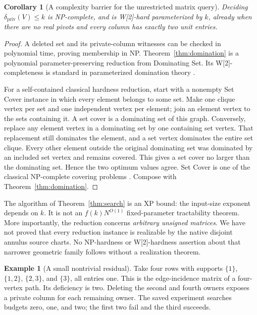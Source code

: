 \documentclass[11pt,letterpaper]{article}
\newtheorem{corollary}[theorem]{Corollary}
\theoremstyle{definition}
\newtheorem{example}[theorem]{Example}
\newcommand{\dpriv}{\delta_{\mathrm{priv}}}
\begin{document}
\begin{corollary}[A complexity barrier for the unrestricted matrix query]\label{cor:hardness}
Deciding $\dpriv(V)\le k$ is NP-complete, and is W[2]-hard parameterized by $k$, already when there are no real pivots and every column has exactly two unit entries.
\end{corollary}
\begin{proof}
A deleted set and its private-column witnesses can be checked in polynomial time, proving membership in NP. Theorem~\ref{thm:domination} is a polynomial parameter-preserving reduction from Dominating Set. Its W[2]-completeness is standard in parameterized domination theory \cite{CP}.

For a self-contained classical hardness reduction, start with a nonempty Set Cover instance in which every element belongs to some set. Make one clique vertex per set and one independent vertex per element; join an element vertex to the sets containing it. A set cover is a dominating set of this graph. Conversely, replace any element vertex in a dominating set by one containing set vertex. That replacement still dominates the element, and a set vertex dominates the entire set clique. Every other element outside the original dominating set was dominated by an included set vertex and remains covered. This gives a set cover no larger than the dominating set. Hence the two optimum values agree. Set Cover is one of the classical NP-complete covering problems \cite{Karp}. Compose with Theorem~\ref{thm:domination}.
\end{proof}

The algorithm of Theorem~\ref{thm:search} is an XP bound: the input-size exponent depends on $k$. It is not an $f(k)N^{O(1)}$ fixed-parameter tractability theorem. More importantly, the reduction concerns \emph{arbitrary unsigned matrices}. We have not proved that every reduction instance is realizable by the native disjoint annulus source charts. No NP-hardness or W[2]-hardness assertion about that narrower geometric family follows without a realization theorem.

\begin{example}[A small nontrivial residual]
Take four rows with supports $\{1\}$, $\{1,2\}$, $\{2,3\}$, and $\{3\}$, all entries one. This is the edge-incidence matrix of a four-vertex path. Its deficiency is two. Deleting the second and fourth owners exposes a private column for each remaining owner. The saved experiment searches budgets zero, one, and two; the first two fail and the third succeeds.
\end{example}
\end{document}

